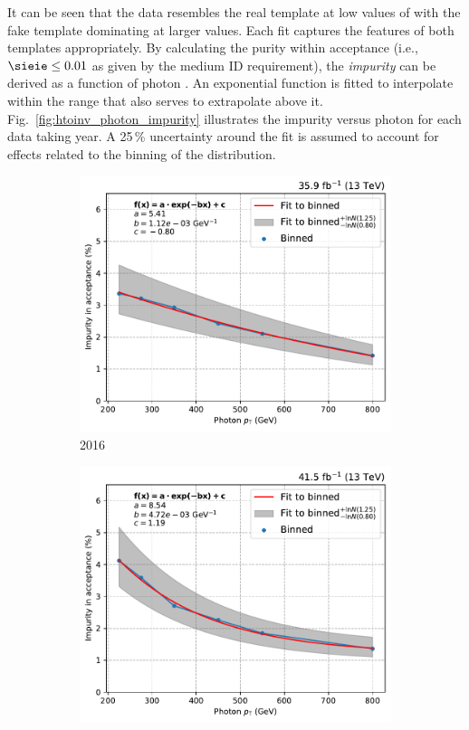 It can be seen that the data resembles the real template at low values of \sieie with the fake template dominating at larger values. Each fit captures the features of both templates appropriately. By calculating the purity within acceptance (i.e., $\sieie \leq \text{0.01}$ as given by the medium ID requirement), the \emph{impurity} can be derived as a function of photon \pt. An exponential function is fitted to interpolate within the range that also serves to extrapolate above it. Fig.~\ref{fig:htoinv_photon_impurity} illustrates the impurity versus photon \pt for each data taking year. A 25\,\% uncertainty around the fit is assumed to account for effects related to the binning of the \sieie distribution.

\begin{figure}[ht]
    \centering
    \begin{subfigure}[b]{0.49\textwidth}
        \includegraphics[width=\textwidth]{figures/photon_purity/2016/impurity_plot_2016.pdf}
        \caption{2016}
    \end{subfigure}
    \hfill
    \begin{subfigure}[b]{0.49\textwidth}
        \includegraphics[width=\textwidth]{figures/photon_purity/2017/impurity_plot_2017.pdf}

\end{subfigure}
\end{figure}
